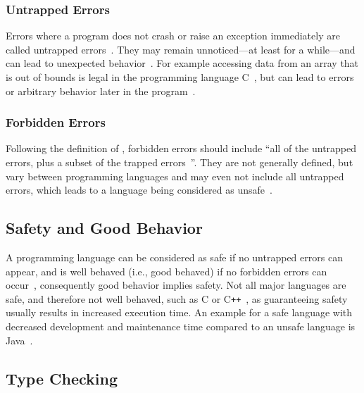 \subsubsection{Untrapped Errors}

Errors where a program does not crash or raise an exception immediately are called untrapped errors~\cite[p.~97-37]{TypeSystems:Cardelli:2004}. They may remain unnoticed---at least for a while---and can lead to unexpected behavior~\cite[p.~97-3]{TypeSystems:Cardelli:2004}. For example accessing data from an array that is out of bounds is legal in the programming language C~\cite[p.~7]{TypesAndProgrammingLanguages:Pierce:2002}, but can lead to errors or arbitrary behavior later in the program~\cite[p.~97-3]{TypeSystems:Cardelli:2004}.

\subsubsection{Forbidden Errors}

Following the definition of \citeauthor{TypeSystems:Cardelli:2004}, forbidden errors should include ``all of the untrapped errors, plus a subset of the trapped errors~\cite[p.~97-3]{TypeSystems:Cardelli:2004}''. They are not generally defined, but vary between programming languages and may even not include all untrapped errors, which leads to a language being  considered as unsafe~\cite[p.~97-4]{TypeSystems:Cardelli:2004}.

\subsection{Safety and Good Behavior}
\label{sec:safety-good-behavior}

A programming language can be considered as safe if no untrapped errors can appear, and is well behaved (i.e., good behaved) if no forbidden errors can occur~\cite[p.~97-3]{TypeSystems:Cardelli:2004}, consequently good behavior implies safety. Not all major languages are safe, and therefore not well behaved, such as C or C\texttt{++}~\cite[p.~6]{TypesAndProgrammingLanguages:Pierce:2002}, as guaranteeing safety usually results in increased execution time. An example for a safe language with decreased development and maintenance time compared to an unsafe language is Java~\cite[p.~97-5]{TypeSystems:Cardelli:2004}.

\subsection{Type Checking}
\label{sec:type-checking}


